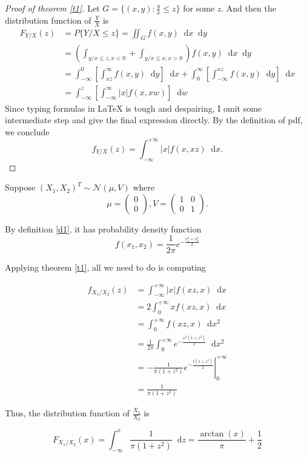 \documentclass[12pt]{article}
\newcommand\N{\mathcal{N}}
\newcommand*{\dif}{\mathop{}\!\mathrm{d}}
\begin{document}
	\begin{proof}[Proof of theorem \ref{t1}]
		Let $G=\{(x,y):\frac{y}{x}\le z\}$ for some $z$. And then the distribution function of $\frac{Y}{X}$ is
		\begin{align*}
			F_{Y/X}(z)&=P\{Y/X\le z\}=\iint_{G} f(x,y) \dif x\dif y\\
			&=(\int_{y/x\le z,x<0}+\int_{y/x\le x,x>0}) f(x,y)\dif x\dif y\\
			&=\int_{-\infty}^0\left[\int_{xz}^{\infty}f(x,y)\dif y\right]\dif x+\int_{0}^{\infty}\left[\int_{-\infty}^{xz}f(x,y)\dif y\right]\dif x\\
			&=\int_{-\infty}^{z}\left[\int_{-\infty}^{\infty}|x|f(x,xw)\right]\dif w
		\end{align*}
		Since typing formulas in \LaTeX{} is tough and despairing, I omit some intermediate step and give the final expression directly. By the definition of pdf, we conclude $$f_{Y/X}(z)=\int_{-\infty}^{+\infty}|x|f(x,xz)\dif x.$$
	\end{proof}
	
	Suppose $(X_1,X_2)^T\sim \N(\mu,V)$ where 
	$$	\mu = 	\left(	\begin{matrix}	0\\	0	\end{matrix}	\right),
	V=	\left(	\begin{matrix}	1&0\\	0&1	\end{matrix}	\right)	.$$
	
	By definition \ref{d1}, it has probability density function 
	$$f(x_1,x_2)=\frac{1}{2\pi}e^{-\frac{x_1^2+x_2^2}{2}}$$
	
	Applying theorem \ref{t1}, all we need to do is computing 
	
	\begin{align*}
		f_{X_1/X_2}(z)&=\int_{-\infty}^{+\infty}|x|f(xz,x)\dif x\\
		&=2\int_{0}^{+\infty}xf(xz,x)\dif x\\
		&=\int_{0}^{+\infty}f(xz,x)\dif x^2\\
		&=\frac{1}{2\pi}\int_{0}^{+\infty}e^{-\frac{x^2(1+z^2)}{2}}\dif x^2\\
		&=-\frac{1}{\pi(1+z^2)} \left.e^{-\frac{t(1+z^2)}{2}}\right|^{+\infty}_0\\
		&=\frac{1}{\pi(1+z^2)}
	\end{align*}
	
	Thus, the distribution function of $\frac{X_1}{X_2}$ is
	
	$$F_{X_1/X_2}(x)=\int_{-\infty}^{x}\frac{1}{\pi(1+z^2)}\dif z=\frac{\arctan(x)}{\pi}+\frac{1}{2}$$

	
\end{document}
